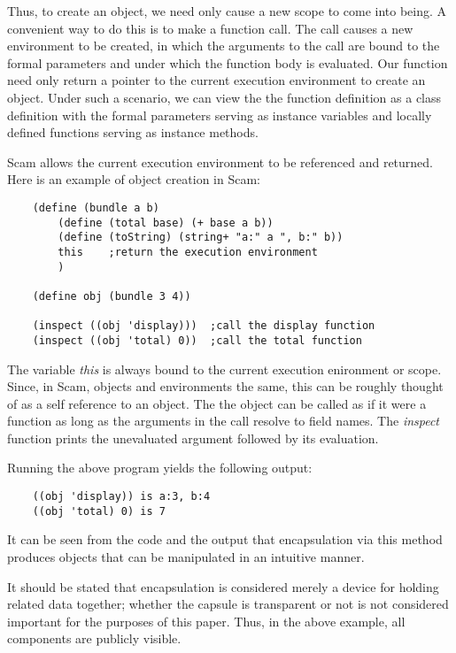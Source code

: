 Thus, to create an object, we need only cause a new scope to come into
being. A convenient way to do this is to make a function call. The call
causes a new environment to be created, in which the arguments to the
call are bound to the formal parameters and under which the function body
is evaluated. Our function need only return a pointer to the current
execution environment to create an object.  Under such a scenario, we
can view the the function definition as a class definition with the
formal parameters serving as instance variables and locally defined
functions serving as instance methods.  

Scam 
allows the current execution environment
to be referenced and returned.
Here is an example of object creation in Scam:

\begin{verbatim}
    (define (bundle a b)
        (define (total base) (+ base a b))
        (define (toString) (string+ "a:" a ", b:" b))
        this    ;return the execution environment
        )

    (define obj (bundle 3 4))

    (inspect ((obj 'display)))  ;call the display function
    (inspect ((obj 'total) 0))  ;call the total function
\end{verbatim}

The variable {\it this} is always bound to the current execution
enironment or scope. Since, in Scam, objects and environments the same,
this can be roughly thought of as a self reference to an object. The
the object can be called as if it were a function as long as the arguments
in the call resolve to field names.
The {\it inspect} function prints the unevaluated argument followed by
its evaluation.

Running the above program yields the following output:

\begin{verbatim}
    ((obj 'display)) is a:3, b:4
    ((obj 'total) 0) is 7
\end{verbatim}

It can be seen from the code and the output that encapsulation via this
method produces objects that can be manipulated in an intuitive manner.

It should be stated that encapsulation is considered merely a device for
holding related data together; whether the capsule is transparent or
not is not considered important for the purposes of this paper. Thus,
in the above example, all components are publicly visible. 

